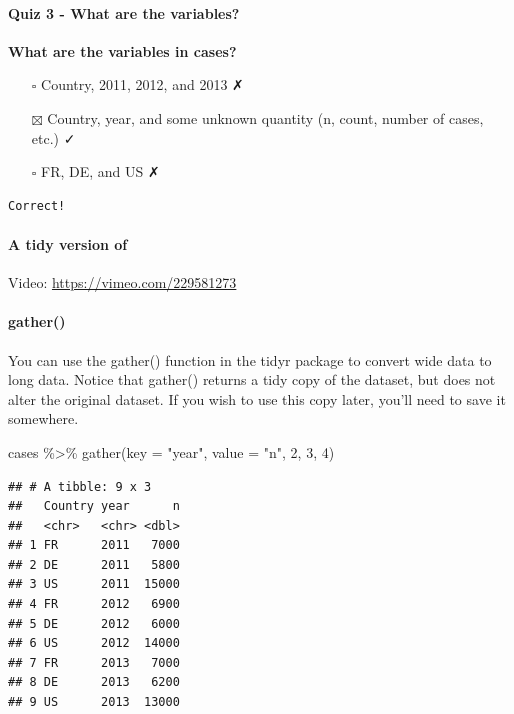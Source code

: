 \documentclass[
]{article}
\newenvironment{Shaded}{\begin{snugshade}}{\end{snugshade}}
\newcommand{\AttributeTok}[1]{\textcolor[rgb]{0.77,0.63,0.00}{#1}}
\newcommand{\DecValTok}[1]{\textcolor[rgb]{0.00,0.00,0.81}{#1}}
\newcommand{\FunctionTok}[1]{\textcolor[rgb]{0.00,0.00,0.00}{#1}}
\newcommand{\NormalTok}[1]{#1}
\newcommand{\SpecialCharTok}[1]{\textcolor[rgb]{0.00,0.00,0.00}{#1}}
\newcommand{\StringTok}[1]{\textcolor[rgb]{0.31,0.60,0.02}{#1}}
\providecommand{\tightlist}{%
  \setlength{\itemsep}{0pt}\setlength{\parskip}{0pt}}
\begin{document}
\hypertarget{quiz-3---what-are-the-variables}{%
\paragraph{Quiz 3 - What are the
variables?}\label{quiz-3---what-are-the-variables}}

\textbf{What are the variables in cases?}

\begin{itemize}
\tightlist
\item[$\square$]
  Country, 2011, 2012, and 2013 ✗
\item[$\boxtimes$]
  Country, year, and some unknown quantity (n, count, number of cases,
  etc.) ✓
\item[$\square$]
  FR, DE, and US ✗
\end{itemize}

\begin{verbatim}
Correct!
\end{verbatim}

\hypertarget{a-tidy-version-of}{%
\paragraph{A tidy version of}\label{a-tidy-version-of}}

Video: \url{https://vimeo.com/229581273}

\hypertarget{gather}{%
\paragraph{gather()}\label{gather}}

You can use the gather() function in the tidyr package to convert wide
data to long data. Notice that gather() returns a tidy copy of the
dataset, but does not alter the original dataset. If you wish to use
this copy later, you'll need to save it somewhere.

\begin{Shaded}
\begin{Highlighting}[]
\NormalTok{cases }\SpecialCharTok{\%\textgreater{}\%} \FunctionTok{gather}\NormalTok{(}\AttributeTok{key =} \StringTok{"year"}\NormalTok{, }\AttributeTok{value =} \StringTok{"n"}\NormalTok{, }\DecValTok{2}\NormalTok{, }\DecValTok{3}\NormalTok{, }\DecValTok{4}\NormalTok{)}
\end{Highlighting}
\end{Shaded}

\begin{verbatim}
## # A tibble: 9 x 3
##   Country year      n
##   <chr>   <chr> <dbl>
## 1 FR      2011   7000
## 2 DE      2011   5800
## 3 US      2011  15000
## 4 FR      2012   6900
## 5 DE      2012   6000
## 6 US      2012  14000
## 7 FR      2013   7000
## 8 DE      2013   6200
## 9 US      2013  13000
\end{verbatim}
\end{document}
